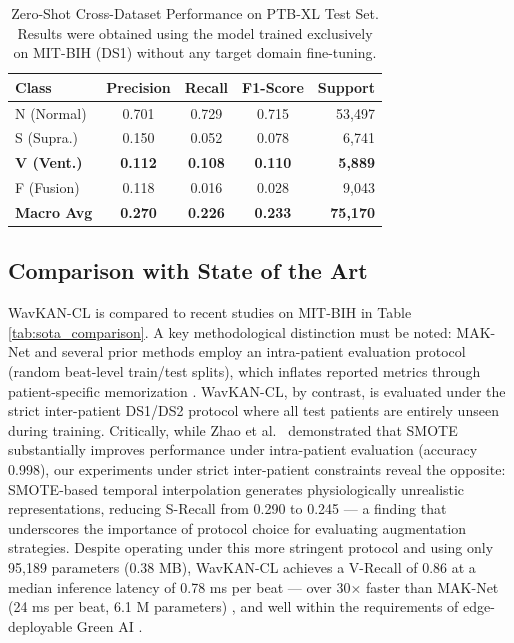 \documentclass[pdflatex,sn-mathphys-num]{sn-jnl}
\theoremstyle{thmstyleone}
\theoremstyle{thmstyletwo}
\theoremstyle{thmstylethree}
\begin{document}
\begin{table}[ht]
\caption{Zero-Shot Cross-Dataset Performance on PTB-XL Test Set. Results were obtained using the model trained exclusively on MIT-BIH (DS1) without any target domain fine-tuning.}
\label{tab:ptbxl_zero_shot}
\centering
\footnotesize
\begin{tabular}{@{}l c c c r@{}}
\toprule
\textbf{Class} & \textbf{Precision} & \textbf{Recall} & \textbf{F1-Score} & \textbf{Support} \\ \midrule
N (Normal) & 0.701 & 0.729 & 0.715 & 53,497 \\
S (Supra.) & 0.150 & 0.052 & 0.078 & 6,741 \\
\textbf{V (Vent.)} & \textbf{0.112} & \textbf{0.108} & \textbf{0.110} & \textbf{5,889} \\
F (Fusion) & 0.118 & 0.016 & 0.028 & 9,043 \\ \midrule
\textbf{Macro Avg} & \textbf{0.270} & \textbf{0.226} & \textbf{0.233} & \textbf{75,170} \\ \bottomrule
\end{tabular}
\end{table}

\subsection{Comparison with State of the Art}
WavKAN-CL is compared to recent studies on MIT-BIH in Table \ref{tab:sota_comparison}. A key methodological distinction must be noted: MAK-Net \cite{zhao_mak-net_2025} and several prior methods employ an intra-patient evaluation protocol (random beat-level train/test splits), which inflates reported metrics through patient-specific memorization \cite{bahrami_investigation_2025}. WavKAN-CL, by contrast, is evaluated under the strict inter-patient DS1/DS2 protocol where all test patients are entirely unseen during training. Critically, while Zhao et al.\ \cite{zhao_mak-net_2025} demonstrated that SMOTE substantially improves performance under intra-patient evaluation (accuracy 0.998), our experiments under strict inter-patient constraints reveal the opposite: SMOTE-based temporal interpolation generates physiologically unrealistic representations, reducing S-Recall from 0.290 to 0.245 --- a finding that underscores the importance of protocol choice for evaluating augmentation strategies. Despite operating under this more stringent protocol and using only 95,189 parameters (0.38 MB), WavKAN-CL achieves a V-Recall of 0.86 at a median inference latency of 0.78 ms per beat --- over 30$\times$ faster than MAK-Net (24 ms per beat, 6.1 M parameters) \cite{zhao_mak-net_2025}, and well within the requirements of edge-deployable Green AI \cite{elsheikhy_lightweight_2025}.
\end{document}
